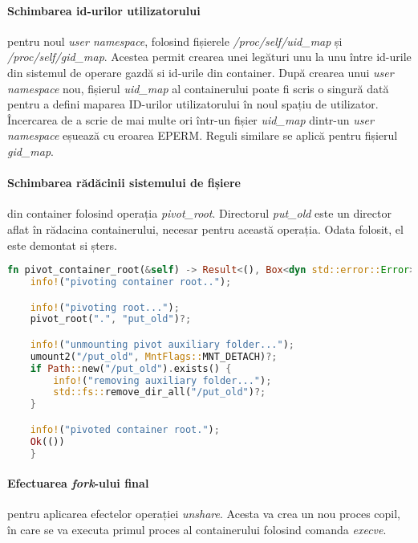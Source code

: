             \paragraph{Schimbarea id-urilor utilizatorului} pentru noul \textit{user namespace}, folosind fișierele \textit{/proc/self/uid\_map} și \textit{/proc/self/gid\_map}. Acestea permit crearea unei legături unu la unu între id-urile din sistemul de operare gazdă si id-urile din container. După crearea unui \textit{user namespace} nou, fișierul \textit{uid\_map} al containerului poate fi scris o singură dată pentru a defini maparea ID-urilor utilizatorului în noul spațiu de utilizator. Încercarea de a scrie de mai multe ori într-un fișier \textit{uid\_map} dintr-un \textit{user namespace} eșuează cu eroarea EPERM. Reguli similare se aplică pentru fișierul \textit{gid\_map}. \cite{ns:user}
            \paragraph{Schimbarea rădăcinii sistemului de fișiere} din container folosind operația \textit{pivot\_root}. Directorul \textit{put\_old} este un director aflat în rădacina containerului, necesar pentru această operația. Odata folosit, el este demontat si șters.
            \begin{lstlisting}[language=Rust, style=boxed, caption={Schimbarea rădăcinii sistemului de fișiere},captionpos=b]
fn pivot_container_root(&self) -> Result<(), Box<dyn std::error::Error>> {
    info!("pivoting container root..");

    info!("pivoting root...");
    pivot_root(".", "put_old")?;

    info!("unmounting pivot auxiliary folder...");
    umount2("/put_old", MntFlags::MNT_DETACH)?;
    if Path::new("/put_old").exists() {
        info!("removing auxiliary folder...");
        std::fs::remove_dir_all("/put_old")?;
    }

    info!("pivoted container root.");
    Ok(())
    }           \end{lstlisting}
                \label{fig:cod_mount2}

            \paragraph{Efectuarea \textit{fork}-ului final} pentru aplicarea efectelor operației \textit{unshare}. Acesta va crea un nou proces copil, în care se va executa primul proces al containerului folosind comanda \textit{execve}.

